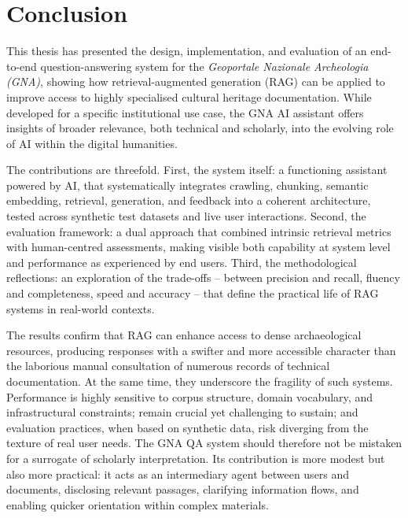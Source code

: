 \chapter{Conclusion}
\label{chap:conclusion}
\begin{spacing}{1.5}
This thesis has presented the design, implementation, and evaluation of an end-to-end question-answering system for the \textit{Geoportale Nazionale Archeologia (GNA)}, showing how retrieval-augmented generation (RAG) can be applied to improve access to highly specialised cultural heritage documentation. While developed for a specific institutional use case, the GNA AI assistant offers insights of broader relevance, both technical and scholarly, into the evolving role of AI within the digital humanities.

The contributions are threefold. First, the system itself: a functioning assistant powered by AI, that systematically integrates crawling, chunking, semantic embedding, retrieval, generation, and feedback into a coherent architecture, tested across synthetic test datasets and live user interactions. Second, the evaluation framework: a dual approach that combined intrinsic retrieval metrics with human-centred assessments, making visible both capability at system level and performance as experienced by end users. Third, the methodological reflections: an exploration of the trade-offs -- between precision and recall, fluency and completeness, speed and accuracy -- that define the practical life of RAG systems in real-world contexts.

The results confirm that RAG can enhance access to dense archaeological resources, producing responses with a swifter and more accessible character than the laborious manual consultation of numerous records of technical documentation. At the same time, they underscore the fragility of such systems. Performance is highly sensitive to corpus structure, domain vocabulary, and infrastructural constraints; remain crucial yet challenging to sustain; and evaluation practices, when based on synthetic data, risk diverging from the texture of real user needs. The GNA QA system should therefore not be mistaken for a surrogate of scholarly interpretation. Its contribution is more modest but also more practical: it acts as an intermediary agent between users and documents, disclosing relevant passages, clarifying information flows, and enabling quicker orientation within complex materials.


\end{spacing}
